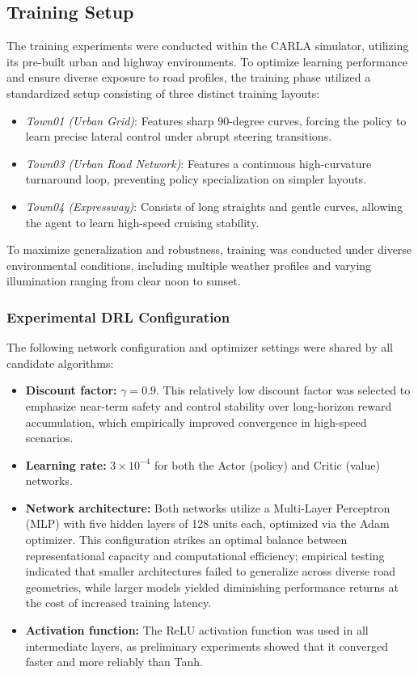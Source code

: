 \documentclass[sn-mathphys,Numbered]{sn-jnl}
\begin{document}
\subsection{Training Setup}
\label{sec:training_setup}

The training experiments were conducted within the CARLA simulator, utilizing its pre-built urban and highway environments. To optimize learning performance and ensure diverse exposure to road profiles, the training phase utilized a standardized setup consisting of three distinct training layouts:
\begin{itemize}
    \item \textit{Town01 (Urban Grid)}: Features sharp 90-degree curves, forcing the policy to learn precise lateral control under abrupt steering transitions.
    \item \textit{Town03 (Urban Road Network)}: Features a continuous high-curvature turnaround loop, preventing policy specialization on simpler layouts.
    \item \textit{Town04 (Expressway)}: Consists of long straights and gentle curves, allowing the agent to learn high-speed cruising stability.
\end{itemize}

To maximize generalization and robustness, training was conducted under diverse environmental conditions, including multiple weather profiles and varying illumination ranging from clear noon to sunset.

\subsubsection{Experimental DRL Configuration}

The following network configuration and optimizer settings were shared by all candidate algorithms:
\begin{itemize}
    \item \textbf{Discount factor:} $\gamma = 0.9$. This relatively low discount factor was selected to emphasize near-term safety and control stability over long-horizon reward accumulation, which empirically improved convergence in high-speed scenarios.
    \item \textbf{Learning rate:} $3 \times 10^{-4}$ for both the Actor (policy) and Critic (value) networks.
    \item \textbf{Network architecture:} Both networks utilize a Multi-Layer Perceptron (MLP) with five hidden layers of 128 units each, optimized via the Adam optimizer. This configuration strikes an optimal balance between representational capacity and computational efficiency; empirical testing indicated that smaller architectures failed to generalize across diverse road geometries, while larger models yielded diminishing performance returns at the cost of increased training latency.
    \item \textbf{Activation function:} The ReLU activation function was used in all intermediate layers, as preliminary experiments showed that it converged faster and more reliably than Tanh.
\end{itemize}
\end{document}
